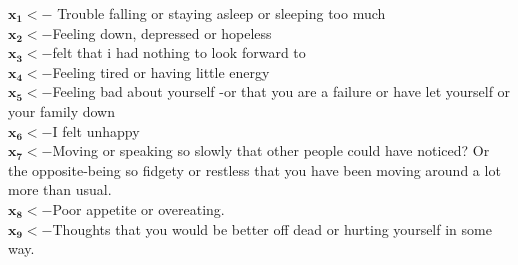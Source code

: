 \documentclass[12pt]{article}
\begin{document}
$\mathbf{x_1}<-$  Trouble falling or staying asleep or sleeping too much\\
$\mathbf{x_2}<-$Feeling down, depressed or hopeless\\
$\mathbf{x_3}<-$felt that i had nothing to look forward to\\
$\mathbf{x_4}<-$Feeling tired or having little energy\\
$\mathbf{x_5}<-$Feeling bad about yourself -or that you are a failure or have let yourself or your family down\\
$\mathbf{x_6}<-$I felt unhappy\\
$\mathbf{x_7}<-$Moving or speaking so slowly that other people could have noticed? Or the opposite-being so fidgety or restless that you have been moving around a lot more than usual.\\
$\mathbf{x_8}<-$Poor appetite or overeating.\\
$\mathbf{x_9}<-$Thoughts that you would be better off dead or hurting yourself in some way.\\

\newpage
\end{document}
